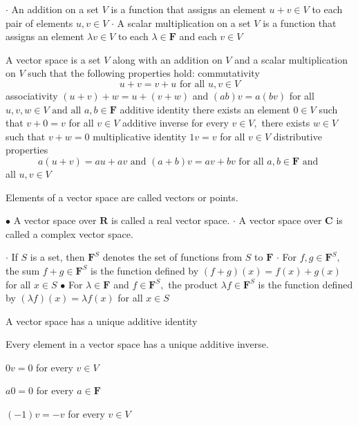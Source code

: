
$\cdot$ An addition on a set $V$ is a function that assigns an element $u+v \in V$
to each pair of elements $u, v \in V$
$\cdot$ A scalar multiplication on a set $V$ is a function that assigns an element $\lambda v \in V$ to each $\lambda \in \mathbf{F}$ and each $v \in V$

A vector space is a set $V$ along with an addition on $V$ and a scalar multiplication on $V$ such that the following properties hold:
commutativity
$$
u+v=v+u \text { for all } u, v \in V
$$
associativity $(u+v)+w=u+(v+w)$ and $(a b) v=a(b v)$ for all $u, v, w \in V 
\text { and all } a, b \in \mathbf{F}
$
additive identity there exists an element $0 \in V$ such that $v+0=v$ for all $v \in V$
additive inverse
for every $v \in V,$ there exists $w \in V$ such that $v+w=0$
multiplicative identity
$1 v=v$ for all $v \in V$
distributive properties
$$
a(u+v)=a u+a v \text { and }(a+b) v=a v+b v \text { for all } a, b \in \mathbf{F} \text { and }
$$
all $u, v \in V$

Elements of a vector space are called vectors or points.

$\bullet$ A vector space over $\mathbf{R}$ is called a real vector space.
$\cdot$ A vector space over $\mathbf{C}$ is called a complex vector space.

$\cdot$ If $S$ is a set, then $\mathbf{F}^{S}$ denotes the set of functions from $S$ to $\mathbf{F}$
$\cdot$ For $f, g \in \mathbf{F}^{S},$ the sum $f+g \in \mathbf{F}^{S}$ is the function defined by
$
(f+g)(x)=f(x)+g(x)
$
for all $x \in S$
$\bullet$ For $\lambda \in \mathbf{F}$ and $f \in \mathbf{F}^{S},$ the product $\lambda f \in \mathbf{F}^{S}$ is the function defined by
$
(\lambda f)(x)=\lambda f(x)
$
for all $x \in S$

A vector space has a unique additive identity

Every element in a vector space has a unique additive inverse.

$0 v=0$ for every $v \in V$

$a 0=0$ for every $a \in \mathbf{F}$

$(-1) v=-v$ for every $v \in V$